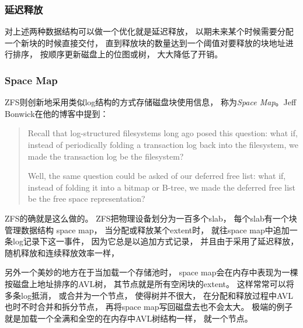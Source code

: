 \subsubsection{延迟释放}
对上述两种数据结构可以做一个优化就是延迟释放，
以期未来某个时候需要分配一个新块的时候直接交付，
直到释放块的数量达到一个阈值对要释放的块地址进行排序，
按顺序更新磁盘上的位图或树，
大大降低了开销。

\subsubsection{Space Map}
ZFS则创新地采用类似log结构的方式存储磁盘块使用信息，
称为{\em Space Map}。Jeff Bonwick在他的博客中提到：

\begin{quotation}
  Recall that log-structured filesystems long  ago posed this question: what if,
  instead of periodically folding a transaction log back into the filesystem, we
  made the transaction log be the filesystem?

  Well, the  same question could  be asked of our  deferred free list:  what if,
  instead of folding it into a bitmap  or B-tree, we made the deferred free list
  be the free space representation?
\end{quotation}

ZFS的确就是这么做的。
ZFS把物理设备划分为一百多个slab，
每个slab有一个块管理数据结构 space map，
当分配或释放某个extent时，
就往space map中追加一条log记录下这一事件，
因为它总是以追加方式记录，
并且由于采用了延迟释放，
随机释放和连续释放效率一样，

另外一个美妙的地方在于当加载一个存储池时，
space map会在内存中表现为一棵按磁盘上地址排序的AVL树，
其节点就是所有空闲块的extent。
这样常常可以将多条log抵消，
或合并为一个节点，
使得树并不很大，
在分配和释放过程中AVL也时不时合并和拆分节点，
再将space map写回磁盘去也不会太大。
极端的例子就是加载一个全满和全空的在内存中AVL树结构一样，
就一个节点。
